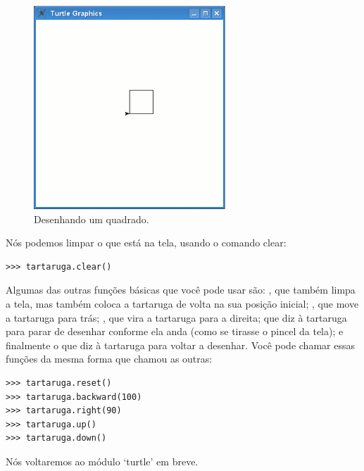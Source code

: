\begin{figure}
\begin{center}
\includegraphics[width=72mm]{eps/figure16.eps}
\end{center}
\caption{Desenhando um quadrado.}\label{fig16}
\end{figure}

Nós podemos limpar o que está na tela, usando o comando clear:

\begin{listing}
\begin{verbatim}
>>> tartaruga.clear()
\end{verbatim}
\end{listing}

Algumas das outras funções básicas que você pode usar são: , que também limpa a tela, mas também coloca a tartaruga de volta na sua posição inicial; , que move a tartaruga para trás; , que vira a tartaruga para a direita;  que diz à tartaruga para parar de desenhar conforme ela anda (como se tirasse o pincel da tela); e finalmente o  que diz à tartaruga para voltar a desenhar. Você pode chamar essas funções da mesma forma que chamou as outras:

\begin{listing}
\begin{verbatim}
>>> tartaruga.reset()
>>> tartaruga.backward(100)
>>> tartaruga.right(90)
>>> tartaruga.up()
>>> tartaruga.down()
\end{verbatim}
\end{listing}

\noindent
Nós voltaremos ao módulo `turtle' em breve.

